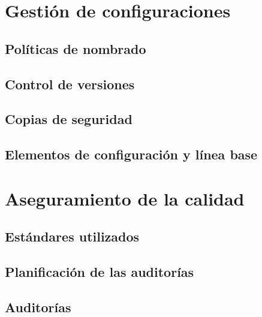 \documentclass[10pt,spanish]{article}
\begin{document}
\section{Gestión de configuraciones}

\blindtext
\subsection{Políticas de nombrado}

\blindtext
\subsection{Control de versiones}

\blindtext
\subsection{Copias de seguridad}

\blindtext
\subsection{Elementos de configuración y línea base}

\blindtext

\section{Aseguramiento de la calidad}

\blindtext
\subsection{Estándares utilizados}

\blindtext
\subsection{Planificación de las auditorías}

\blindtext
\subsection{Auditorías}

\blindtext
\end{document}
